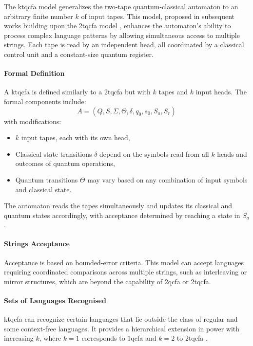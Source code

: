   
The \gls{ktqcfa} model generalizes the two-tape quantum-classical automaton to an arbitrary finite number $k$ of input tapes. This model, proposed in subsequent works building upon the \gls{2tqcfa} model \cite{zheng2011two}, enhances the automaton's ability to process complex language patterns by allowing simultaneous access to multiple strings. Each tape is read by an independent head, all coordinated by a classical control unit and a constant-size quantum register.

\paragraph{Formal Definition}  
A \gls{ktqcfa} is defined similarly to a \gls{2tqcfa} but with $k$ tapes and $k$ input heads. The formal components include:
\[
A = (Q, S, \Sigma, \Theta, \delta, q_0, s_0, S_a, S_r)
\]
with modifications:
\begin{itemize}
    \item $k$ input tapes, each with its own head,
    \item Classical state transitions $\delta$ depend on the symbols read from all $k$ heads and outcomes of quantum operations,
    \item Quantum transitions $\Theta$ may vary based on any combination of input symbols and classical state.
\end{itemize}
The automaton reads the tapes simultaneously and updates its classical and quantum states accordingly, with acceptance determined by reaching a state in $S_a$.

\paragraph{Strings Acceptance}  
Acceptance is based on bounded-error criteria. This model can accept languages requiring coordinated comparisons across multiple strings, such as interleaving or mirror structures, which are beyond the capability of \gls{2qcfa} or \gls{2tqcfa}.

\paragraph{Sets of Languages Recognised}  
\gls{ktqcfa} can recognize certain languages that lie outside the class of regular and some context-free languages. It provides a hierarchical extension in power with increasing $k$, where $k=1$ corresponds to \gls{1qcfa} and $k=2$ to \gls{2tqcfa} \cite{li2015hybrid}.

